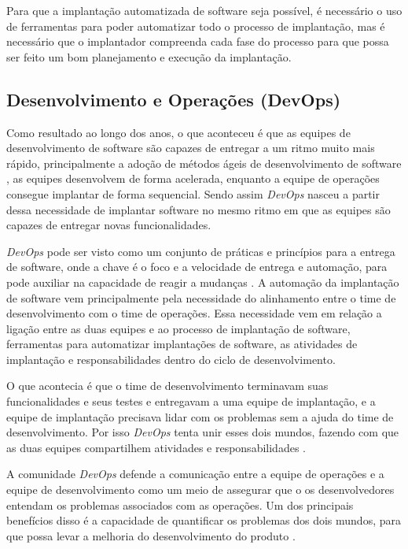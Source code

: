 Para que a implantação automatizada de software seja possível, é necessário o uso
de ferramentas para poder automatizar todo o processo de implantação,
mas é necessário que o implantador compreenda cada fase do processo para que possa ser
feito um bom planejamento e execução da implantação.

\subsection{Desenvolvimento e Operações (DevOps)}
\label{subsec:DevOps}
Como resultado ao longo dos anos, o que aconteceu é que as equipes de desenvolvimento de software
são capazes de entregar a um ritmo muito mais rápido, principalmente a adoção
de métodos ágeis de desenvolvimento de software \cite{7173368}, as 
equipes desenvolvem de forma acelerada, enquanto a equipe de operações consegue 
implantar de forma sequencial. Sendo assim \textit{DevOps}
nasceu a partir dessa necessidade de implantar software no mesmo ritmo em que
as equipes são capazes de entregar novas funcionalidades.

\textit{DevOps} pode ser visto como um conjunto de práticas e princípios para a entrega de software, onde a
chave é o foco e a velocidade de entrega e automação, para pode auxiliar na capacidade
de reagir a mudanças \cite{7173368}. A automação da implantação de software vem
principalmente pela necessidade do alinhamento entre o time de desenvolvimento
com o time de operações. Essa necessidade vem em relação a ligação entre as duas
equipes e ao processo de implantação de software, ferramentas para
automatizar implantações de software, as atividades de implantação e responsabilidades
dentro do ciclo de desenvolvimento. 

O que acontecia é que o time de desenvolvimento terminavam suas funcionalidades e seus testes e
entregavam a uma equipe de implantação, e a equipe de implantação precisava
lidar com os problemas sem a ajuda do time de desenvolvimento. Por isso \textit{DevOps} 
tenta unir esses dois mundos, fazendo com que as duas equipes compartilhem atividades
 e responsabilidades \cite{6265084}.

A comunidade \textit{DevOps} defende a comunicação
entre a equipe de operações e a equipe de desenvolvimento como um meio de assegurar
que o os desenvolvedores entendam os problemas associados com as operações. Um dos
principais benefícios disso é a capacidade de quantificar os problemas dos dois mundos,
para que possa levar a melhoria do desenvolvimento do produto \cite{httermann2012DevOps}.

